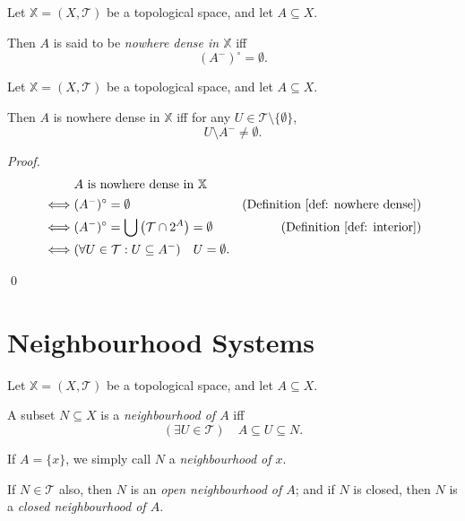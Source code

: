 \begin{definition}
	\label{def: nowhere dense}
	Let $\mathbb X = (X, \mathcal T)$ be a topological space, and let $A \subseteq X$.
	
	Then $A$ is said to be \textit{nowhere dense in $\mathbb X$} iff
	$$
	\left( A^- \right)^\circ = \emptyset.
	$$
\end{definition}


\begin{proposition}
	Let $\mathbb X = (X, \mathcal T)$ be a topological space, and let $A \subseteq X$.
	
	Then $A$ is nowhere dense in $\mathbb X$ iff for any $U \in \mathcal T \setminus \{\emptyset\}$,
	$$
	U \setminus A^- \ne \emptyset.
	$$
	
	\begin{proof}
		$$
		\begin{aligned}
			& \text{$A$ is nowhere dense in $\mathbb X$} \\
			\iff & (A^-)^\circ = \emptyset 
				& \text{(Definition \ref{def: nowhere dense})}\\
			\iff & (A^-)^\circ = \bigcup \left( \mathcal T \cap 2^A \right) = \emptyset 
				& \text{(Definition \ref{def: interior})} \\
			\iff & (\forall U \in \mathcal T: U \subseteq A^-) \quad U = \emptyset.
		\end{aligned}
		$$
		
		\qed
	\end{proof}
\end{proposition}



\section{Neighbourhood Systems}


\begin{definition}
	\label{def: neighbourhood}
	Let $\mathbb X = (X, \mathcal T)$ be a topological space, and let $A \subseteq X$.
	
	A subset $N \subseteq X$ is a \textit{neighbourhood of $A$} iff
	$$
	(\exists U \in \mathcal T) \quad A \subseteq U \subseteq N.
	$$
	
	If $A = \{x\}$, we simply call $N$ a \textit{neighbourhood of $x$}.
	
	If $N \in \mathcal T$ also, then $N$ is an \textit{open neighbourhood of $A$}; and if $N$ is closed, then $N$ is a \textit{closed neighbourhood of $A$}.
\end{definition}


